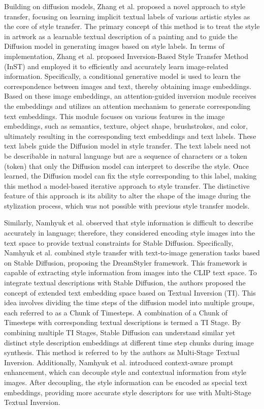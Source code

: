 \documentclass[preprint,12pt]{elsarticle}
\begin{document}
Building on diffusion models, Zhang et al.\citep{62zhang2023inversion} proposed a novel approach to style transfer, focusing on learning implicit textual labels of various artistic styles as the core of style transfer. The primary concept of this method is to treat the style in artwork as a learnable textual description of a painting and to guide the Diffusion model in generating images based on style labels. In terms of implementation, Zhang et al. proposed Inversion-Based Style Transfer Method (InST) and employed it to efficiently and accurately learn image-related information. Specifically, a conditional generative model is used to learn the correspondence between images and text, thereby obtaining image embeddings. Based on these image embeddings, an attention-guided inversion module receives the embeddings and utilizes an attention mechanism to generate corresponding text embeddings. This module focuses on various features in the image embeddings, such as semantics, texture, object shape, brushstrokes, and color, ultimately resulting in the corresponding text embeddings and text labels. These text labels guide the Diffusion model in style transfer. The text labels need not be describable in natural language but are a sequence of characters or a token (token) that only the Diffusion model can interpret to describe the style. Once learned, the Diffusion model can fix the style corresponding to this label, making this method a model-based iterative approach to style transfer. The distinctive feature of this approach is its ability to alter the shape of the image during the stylization process, which was not possible with previous style transfer models.

Similarly, Namhyuk et al.\citep{63ahn2024dreamstyler} observed that style information is difficult to describe accurately in language; therefore, they considered encoding style images into the text space to provide textual constraints for Stable Diffusion. Specifically, Namhyuk et al.\citep{63ahn2024dreamstyler} combined style transfer with text-to-image generation tasks based on Stable Diffusion, proposing the DreamStyler framework. This framework is capable of extracting style information from images into the CLIP text space.
To integrate textual descriptions with Stable Diffusion, the authors proposed the concept of extended text embedding space based on Textual Inversion (TI). This idea involves dividing the time steps of the diffusion model into multiple groups, each referred to as a Chunk of Timesteps. A combination of a Chunk of Timesteps with corresponding textual descriptions is termed a TI Stage. By combining multiple TI Stages, Stable Diffusion can understand similar yet distinct style description embeddings at different time step chunks during image synthesis. This method is referred to by the authors as Multi-Stage Textual Inversion.
Additionally, Namhyuk et al.\citep{63ahn2024dreamstyler} introduced context-aware prompt enhancement, which can decouple style and contextual information from style images. After decoupling, the style information can be encoded as special text embeddings, providing more accurate style descriptors for use with Multi-Stage Textual Inversion.
\end{document}
